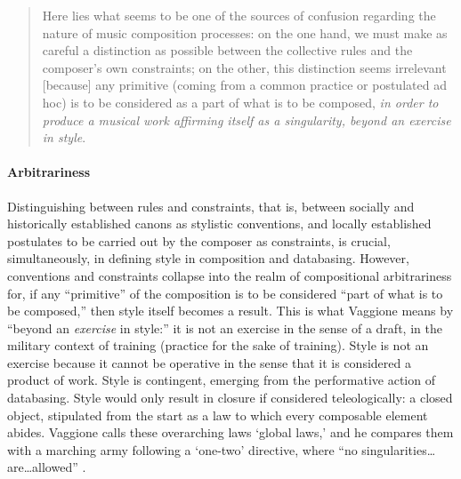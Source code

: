 \begin{quote}
	Here lies what seems to be one of the sources of confusion regarding the nature of music composition processes: on the one hand, we must make as careful a distinction as possible between the collective rules and the composer's own constraints; on the other, this distinction seems irrelevant [because] any primitive (coming from a common practice or postulated ad hoc) is to be considered as a part of what is to be composed, \textit{in order to produce a musical work affirming itself as a singularity, beyond an exercise in style}. \im \parencite[59]{Vag01:Som}
\end{quote}


\paragraph{Arbitrariness}
Distinguishing between rules and constraints, that is, between socially and historically established canons as stylistic conventions, and locally established postulates to be carried out by the composer as constraints, is crucial, simultaneously, in defining style in composition and databasing. However, conventions and constraints collapse into the realm of compositional arbitrariness for, if any ``primitive'' of the composition is to be considered ``part of what is to be composed,'' then style itself becomes a result. This is what Vaggione means by ``beyond an \textit{exercise} in style:'' it is not an exercise in the sense of a draft, in the military context of training (practice for the sake of training). Style is not an exercise because it cannot be operative in the sense that it is considered a product of work. Style is contingent, emerging from the performative action of databasing. Style would only result in closure if considered teleologically: a closed object, stipulated from the start as a law to which every composable element abides. Vaggione calls these overarching laws `global laws,' and he compares them with a marching army following a `one-two' directive, where ``no singularities\dots are\dots allowed'' \parencite[101]{Vag93:Det}.



